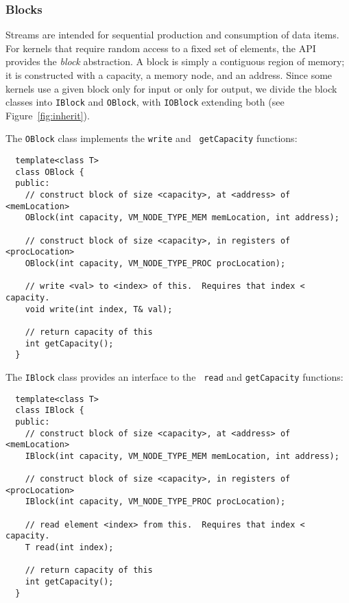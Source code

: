 
\subsubsection{Blocks}
\label{sec:blocks}

Streams are intended for sequential production and consumption of data
items.  For kernels that require random access to a fixed set of
elements, the API provides the {\it block} abstraction.  A block is
simply a contiguous region of memory; it is constructed with a
capacity, a memory node, and an address.  Since some kernels use a
given block only for input or only for output, we divide the block
classes into {\tt IBlock} and {\tt OBlock}, with {\tt IOBlock}
extending both (see Figure~\ref{fig:inherit}).

The {\tt OBlock} class implements the {\tt write} and {\tt
getCapacity} functions:

{\small
\begin{verbatim}
  template<class T>
  class OBlock {
  public:
    // construct block of size <capacity>, at <address> of <memLocation>
    OBlock(int capacity, VM_NODE_TYPE_MEM memLocation, int address);

    // construct block of size <capacity>, in registers of <procLocation>
    OBlock(int capacity, VM_NODE_TYPE_PROC procLocation);

    // write <val> to <index> of this.  Requires that index < capacity.
    void write(int index, T& val);

    // return capacity of this
    int getCapacity();
  }
\end{verbatim}}

\noindent The {\tt IBlock} class provides an interface to the {\tt
read} and {\tt getCapacity} functions:

{\small
\begin{verbatim}
  template<class T>
  class IBlock {
  public:
    // construct block of size <capacity>, at <address> of <memLocation>
    IBlock(int capacity, VM_NODE_TYPE_MEM memLocation, int address);

    // construct block of size <capacity>, in registers of <procLocation>
    IBlock(int capacity, VM_NODE_TYPE_PROC procLocation);

    // read element <index> from this.  Requires that index < capacity.
    T read(int index);

    // return capacity of this
    int getCapacity();
  }
\end{verbatim}}

